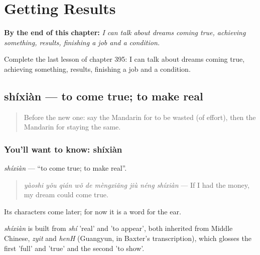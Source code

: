 
\chapter{Getting Results}
\label{ch:zh-getting-results}

\begin{chapteropening}
\textbf{By the end of this chapter:} \emph{I can talk about dreams coming true, achieving something, results, finishing a job and a condition.}

Complete the last lesson of chapter 395: I can talk about dreams coming true, achieving something, results, finishing a job and a condition.
\end{chapteropening}

\section[shíxiàn]{shíxiàn — to come true; to make real}

\label{lesson:ZH-C395-shixian}



\begin{quote}
Before the new one: say the Mandarin for to be wasted (of effort), then the Mandarin for staying the same.
\end{quote}

\subsection*{You'll want to know: shíxiàn}
\emph{shíxiàn} — \textquotedblleft{}to come true; to make real\textquotedblright{}.

\begin{quote}
\emph{yàoshi yǒu qián wǒ de mèngxiǎng jiù néng shíxiàn} — If I had the money, my dream could come true.
\end{quote}

Its characters come later; for now it is a word for the ear.

\begin{cousinweb}
\emph{shíxiàn} is built from \emph{shí} 'real' and  'to appear', both inherited from Middle Chinese, \emph{zyit} and \emph{henH} (Guangyun, in Baxter's transcription), which glosses the first 'full' and 'true' and the second 'to show'.
\end{cousinweb}

